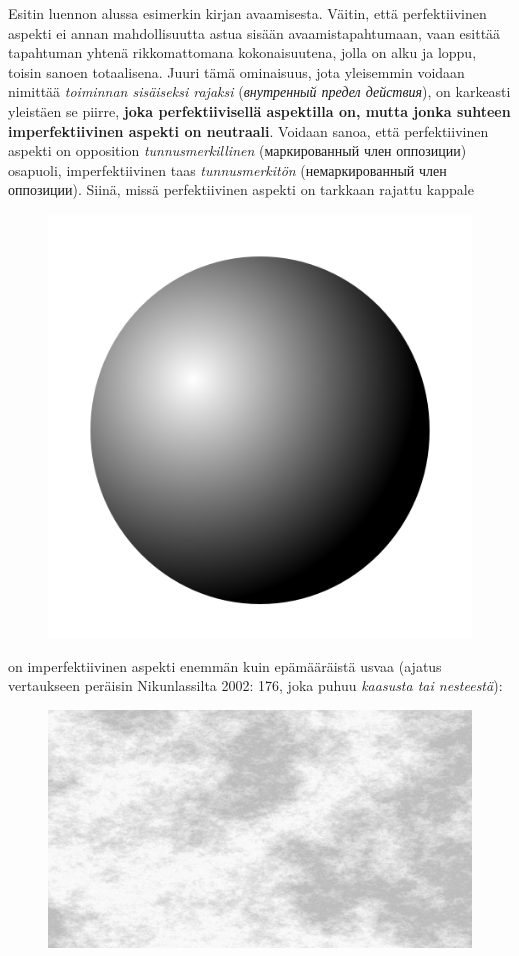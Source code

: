 \documentclass[]{scrartcl}
\begin{document}
Esitin luennon alussa esimerkin kirjan avaamisesta. Väitin, että
perfektiivinen aspekti ei annan mahdollisuutta astua sisään
avaamistapahtumaan, vaan esittää tapahtuman yhtenä rikkomattomana
kokonaisuutena, jolla on alku ja loppu, toisin sanoen totaalisena. Juuri
tämä ominaisuus, jota yleisemmin voidaan nimittää \emph{toiminnan
sisäiseksi rajaksi} (\emph{внутренный предел действия}), on karkeasti
yleistäen se piirre, \textbf{joka perfektiivisellä aspektilla on, mutta
jonka suhteen imperfektiivinen aspekti on neutraali}. Voidaan sanoa,
että perfektiivinen aspekti on opposition \emph{tunnusmerkillinen}
(маркированный член оппозиции) osapuoli, imperfektiivinen taas
\emph{tunnusmerkitön} (немаркированный член оппозиции). Siinä, missä
perfektiivinen aspekti on tarkkaan rajattu kappale

\begin{figure}[htbp]
\centering
\includegraphics{figure/sphere.png}
\caption{}
\end{figure}

on imperfektiivinen aspekti enemmän kuin epämääräistä usvaa (ajatus
vertaukseen peräisin Nikunlassilta 2002: 176, joka puhuu \emph{kaasusta
tai nesteestä}):

\begin{figure}[htbp]
\centering
\includegraphics{figure/silver-gray-mist-background.jpg}
\caption{}
\end{figure}
\end{document}
